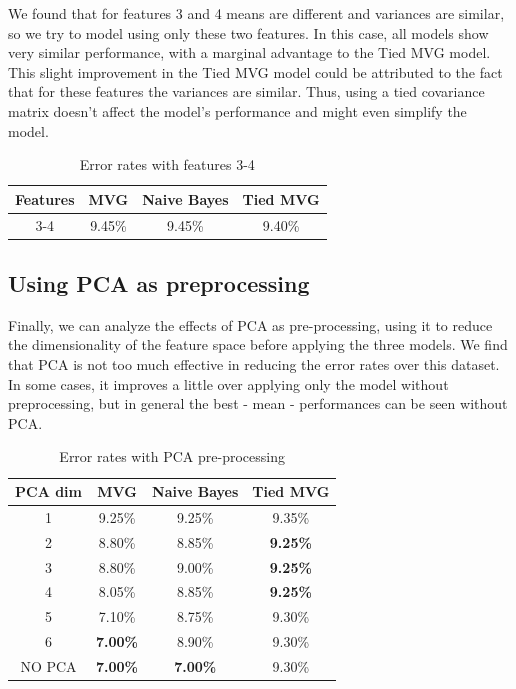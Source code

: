 \documentclass[12pt, a4paper]{article}
\begin{document}
We found that for features 3 and 4 means are different and variances are similar, so we try to model using only these two features. In this case, all models show very similar performance, with a marginal advantage to the Tied MVG model. This slight improvement in the Tied MVG model could be attributed to the fact that for these features the variances are similar. Thus, using a tied covariance matrix doesn't affect the model's performance and might even simplify the model.

\begin{table}[ht!]
	\centering
 	\begin{tabular}{| | c c c c | |} 
 		\hline
 		Features & MVG & Naive Bayes & Tied MVG\\
 		\hline\hline
 		3-4 & 9.45\% & 9.45\% & 9.40\%\\
 		\hline
 	\end{tabular}
	\caption{Error rates with features 3-4}
\end{table}

\subsection{Using PCA as preprocessing}

Finally, we can analyze the effects of PCA as pre-processing, using it to reduce the dimensionality of the feature space before applying the three models. We find that PCA is not too much effective in reducing the error rates over this dataset. In some cases, it improves a little over applying only the model without preprocessing, but in general the best - mean - performances can be seen without PCA.

\begin{table}[ht!]
	\centering
 	\begin{tabular}{| | c c c c | |} 
 		\hline
 		PCA dim & MVG & Naive Bayes & Tied MVG\\
 		\hline\hline
 		1 & 9.25\% & 9.25\% & 9.35\%\\
 		\hline
 		2 & 8.80\% & 8.85\% & \textbf{9.25\%}\\
 		\hline
 		3 & 8.80\% & 9.00\% & \textbf{9.25\%}\\
 		\hline
 		4 & 8.05\% & 8.85\% & \textbf{9.25\%}\\
 		\hline
 		5 & 7.10\% & 8.75\% & 9.30\%\\
 		\hline
 		6 & \textbf{7.00\%} & 8.90\% & 9.30\%\\
 		\hline
 		\hline
 		NO PCA & \textbf{7.00\%} & \textbf{7.00\%} & 9.30\%\\
 		\hline 
 	\end{tabular}
	\caption{Error rates with PCA pre-processing}
\end{table}
\end{document}
